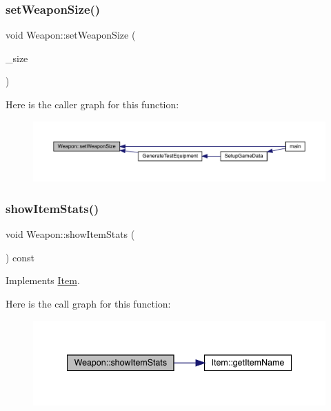 \subsubsection{\texorpdfstring{set\+Weapon\+Size()}{setWeaponSize()}}
{\footnotesize\ttfamily void Weapon\+::set\+Weapon\+Size (\begin{DoxyParamCaption}\item[{\mbox{\hyperlink{_weapon_8hpp_a160076f6c574c69cd1ce2b3f42cf3755}{En\+Weapon\+Size}}}]{\+\_\+size }\end{DoxyParamCaption})}

Here is the caller graph for this function\+:
\nopagebreak
\begin{figure}[H]
\begin{center}
\leavevmode
\includegraphics[width=350pt]{db/de5/class_weapon_a78e4b6c131a25e93f647594191bae38d_icgraph}
\end{center}
\end{figure}
\mbox{\label{class_weapon_a5bd0118be0d84307c0865a63d907fec7}} 
\subsubsection{\texorpdfstring{show\+Item\+Stats()}{showItemStats()}}
{\footnotesize\ttfamily void Weapon\+::show\+Item\+Stats (\begin{DoxyParamCaption}{ }\end{DoxyParamCaption}) const\hspace{0.3cm}{\ttfamily [virtual]}}



Implements \mbox{\hyperlink{class_item_aaf7dae41afdce432c11261043e8e4e30}{Item}}.

Here is the call graph for this function\+:
\nopagebreak
\begin{figure}[H]
\begin{center}
\leavevmode
\includegraphics[width=341pt]{db/de5/class_weapon_a5bd0118be0d84307c0865a63d907fec7_cgraph}
\end{center}
\end{figure}


